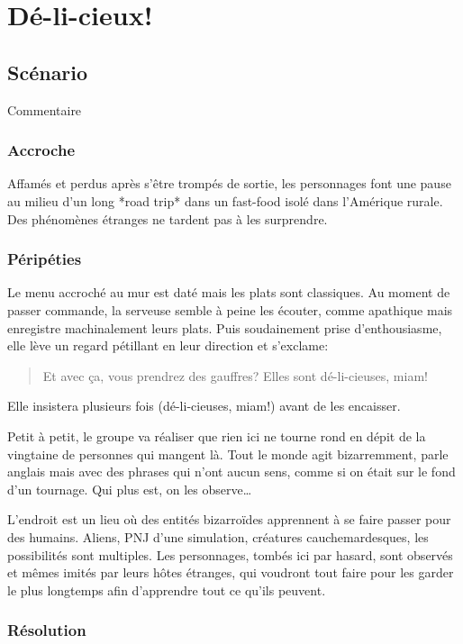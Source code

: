 \chapter{Dé-li-cieux!}

\section{Scénario}

Commentaire

\subsection{Accroche}

Affamés et perdus après s'être trompés de sortie, les personnages font une pause au milieu d'un long *road trip* dans un fast-food isolé dans l'Amérique rurale. Des phénomènes étranges ne tardent pas à les surprendre.

\subsection{Péripéties}

Le menu accroché au mur est daté mais les plats sont classiques. Au moment de passer commande, la serveuse semble à peine les écouter, comme apathique mais enregistre machinalement leurs plats. Puis soudainement prise d'enthousiasme, elle lève un regard pétillant en leur direction et s'exclame:

\blockquote{Et avec ça, vous prendrez des gauffres? Elles sont dé-li-cieuses, miam!}

Elle insistera plusieurs fois (dé-li-cieuses, miam!) avant de les encaisser.

Petit à petit, le groupe va réaliser que rien ici ne tourne rond en dépit de la vingtaine de personnes qui mangent là. Tout le monde agit bizarremment, parle \og anglais \fg mais avec des phrases qui n'ont aucun sens, comme si on était sur le fond d'un tournage. Qui plus est, on les observe…

L'endroit est un lieu où des entités bizarroïdes apprennent à se faire passer pour des humains. Aliens, PNJ d'une simulation, créatures cauchemardesques, les possibilités sont multiples. Les personnages, tombés ici par hasard, sont observés et mêmes imités par leurs hôtes étranges, qui voudront tout faire pour les garder le plus longtemps afin d'apprendre tout ce qu'ils peuvent.

\subsection{Résolution}
